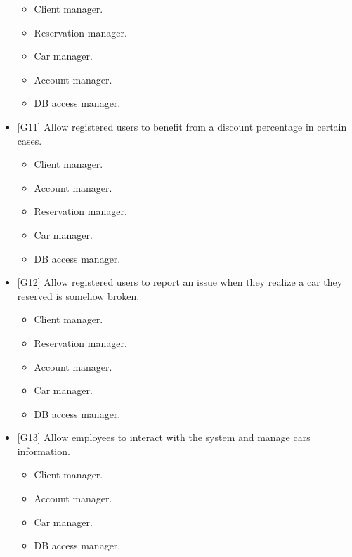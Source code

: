 \begin{itemize}
\begin{itemize}
		\item Client manager.
		\item Reservation manager.
		\item Car manager.
		\item Account manager.
		\item DB access manager.
	\end{itemize} 
	\item {[G11]} Allow registered users to benefit from a discount percentage in certain cases.
	\begin{itemize}
		\item Client manager.
		\item Account manager.
		\item Reservation manager.
		\item Car manager.
		\item DB access manager.
	\end{itemize} 
	\item {[G12]} Allow registered users to report an issue when they realize a car they reserved is somehow broken.
	\begin{itemize}
		\item Client manager.
		\item Reservation manager.
		\item Account manager.
		\item Car manager.
		\item DB access manager.
	\end{itemize} 
	\item {[G13]} Allow employees to interact with the system and manage cars information.
	\begin{itemize}
		\item Client manager.
		\item Account manager.
		\item Car manager.
		\item DB access manager.
	\end{itemize} 
\end{itemize}
